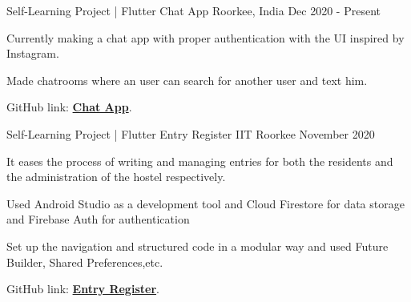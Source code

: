 

\begin{cventries}

  \cventry
    {Self-Learning Project | Flutter} %
    {Chat App} %
    {Roorkee, India} %
    {Dec 2020 - Present} %
    {
      \begin{cvitems} %
        \item {Currently making a chat app with proper authentication with the UI inspired by Instagram.}
        \item {Made chatrooms where an user can search for another user and text him.}
        \item {GitHub link: {\href{https://github.com/anshikamittal25/instagram_clone}{\bf Chat App}}.}
      \end{cvitems}
    }
    
\cventry
    {Self-Learning Project | Flutter} %
    {Entry Register} %
    {IIT Roorkee} %
    {November 2020} %
    {
      \begin{cvitems} %
        \item {It eases the process of writing and managing entries for both the residents and the administration of the hostel respectively.}
        \item {Used Android Studio as a development tool and Cloud Firestore for data storage and Firebase Auth for authentication}
        \item {Set up the navigation and structured code in a modular way and used Future Builder, Shared Preferences,etc.}
        \item {GitHub link: {\href{https://github.com/anshikamittal25/entry_register}{\bf Entry Register}}.}
      \end{cvitems}
    }
    

\end{cventries}

